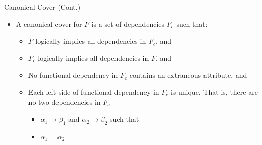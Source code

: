 \documentclass{beamer}
\begin{document}
\begin{frame}{Canonical Cover (Cont.)}
    \begin{itemize}
        \item A canonical cover for $F$ is a set of dependencies $F_c$ such that:
            \begin{itemize}
                \item $F$ logically implies all dependencies in $F_c$, and
                \item $F_c$ logically implies all dependencies in $F$, and
                \item No functional dependency in $F_c$ contains an extraneous attribute, and
                \item Each left side of functional dependency in $F_c$ is unique.  That is, there are no two dependencies in $F_c$
                    \begin{itemize}
                        \item $\alpha_1 \rightarrow \beta_1$ and $\alpha_2 \rightarrow \beta_2$ such that
                        \item $\alpha_1 = \alpha_2$
                    \end{itemize}
            \end{itemize}
    \end{itemize}
\end{frame}
\end{document}
